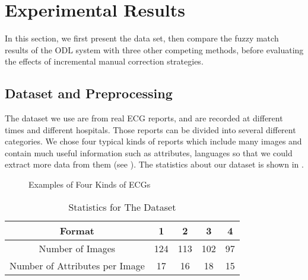 \section{Experimental Results}
\label{sec:eval}
In this section, we first present the data set, 
then compare the fuzzy match results
of the ODL system with three other competing methods, before evaluating the
effects of incremental manual correction strategies.

\subsection{Dataset and Preprocessing}
The dataset we use are from real ECG reports, and are recorded at 
different times and different hospitals. Those reports can be 
divided into several different categories. We chose four typical kinds 
of reports which include many images and contain much useful information 
such as attributes, languages so that we could extract more data 
from them (see ).
The statistics about our dataset is shown in . 

\begin{figure}[th]
\centering
{}
{}
\hfill
{}
\caption{Examples of Four Kinds of ECGs}
\label{fig:dataset}
\end{figure}

\begin{table}[th]
\centering
\caption{Statistics for The Dataset}
\label{tab:statis}
\begin{tabular}{|c|c|c|c|c|}
\hline
Format & 1 & 2 & 3 & 4\\
\hline \hline
Number of Images & 124 & 113 & 102 & 97\\ 
\hline
Number of Attributes per Image & 17 & 16 & 18 & 15 \\
\hline
\end{tabular}
\end{table}

